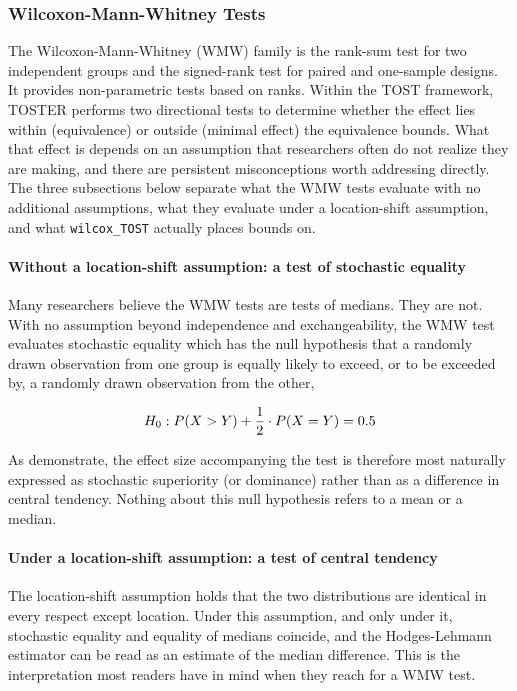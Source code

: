 \documentclass[]{interact}
\theoremstyle{plain}%
\theoremstyle{definition}
\theoremstyle{remark}
\begin{document}
\subsubsection{Wilcoxon-Mann-Whitney
Tests}\label{wilcoxon-mann-whitney-tests}

The Wilcoxon-Mann-Whitney (WMW) family is the rank-sum test for two
independent groups and the signed-rank test for paired and one-sample
designs. It provides non-parametric tests based on ranks. Within the
TOST framework, TOSTER performs two directional tests to determine
whether the effect lies within (equivalence) or outside (minimal effect)
the equivalence bounds. What that effect is depends on an assumption
that researchers often do not realize they are making, and there are
persistent misconceptions worth addressing directly. The three
subsections below separate what the WMW tests evaluate with no
additional assumptions, what they evaluate under a location-shift
assumption, and what \texttt{wilcox\_TOST} actually places bounds on.

\paragraph{Without a location-shift assumption: a test of stochastic
equality}\label{without-a-location-shift-assumption-a-test-of-stochastic-equality}

Many researchers believe the WMW tests are tests of medians. They are
not. With no assumption beyond independence and exchangeability, the WMW
test evaluates stochastic equality which has the null hypothesis that a
randomly drawn observation from one group is equally likely to exceed,
or to be exceeded by, a randomly drawn observation from the other,

\[
H_0: \space P(X > Y) + \frac{1}{2} \cdot P(X = Y) = 0.5
\]

As \citet{Fay_Malinovsky_2018} demonstrate, the effect size accompanying
the test is therefore most naturally expressed as stochastic superiority
(or dominance) rather than as a difference in central tendency. Nothing
about this null hypothesis refers to a mean or a median.

\paragraph{Under a location-shift assumption: a test of central
tendency}\label{under-a-location-shift-assumption-a-test-of-central-tendency}

The location-shift assumption holds that the two distributions are
identical in every respect except location. Under this assumption, and
only under it, stochastic equality and equality of medians coincide, and
the Hodges-Lehmann estimator can be read as an estimate of the median
difference. This is the interpretation most readers have in mind when
they reach for a WMW test.
\end{document}
